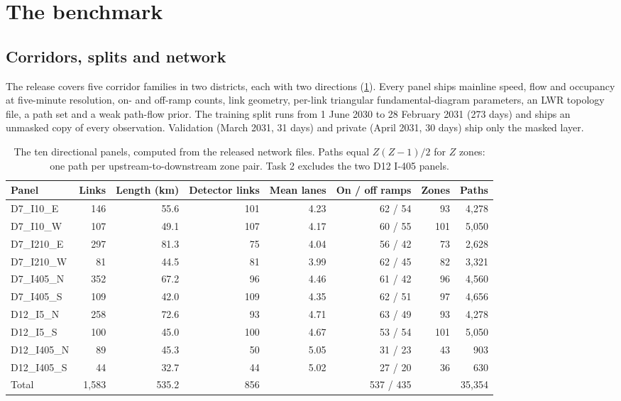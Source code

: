 \section{The benchmark}\label{sec:benchmark}

\subsection{Corridors, splits and network}
The release covers five corridor families in two districts, each with two directions (\cref{tab:corridors}).
Every panel ships mainline speed, flow and occupancy at five-minute resolution, on- and off-ramp counts, link
geometry, per-link triangular fundamental-diagram parameters, an LWR topology file, a path set and a weak path-flow
prior. The training split runs from 1 June 2030 to 28 February 2031 (273 days) and ships an unmasked copy of every
observation. Validation (March 2031, 31 days) and private (April 2031, 30 days) ship only the masked layer.

\begin{table}[h]
\centering\small
\caption{The ten directional panels, computed from the released network files. Paths equal $Z(Z-1)/2$ for $Z$
zones: one path per upstream-to-downstream zone pair. Task 2 excludes the two D12 I-405 panels.}\label{tab:corridors}
\begin{tabular}{@{}l r r r r r r r@{}}
\toprule
Panel & Links & Length (km) & Detector links & Mean lanes & On / off ramps & Zones & Paths \\
\midrule
D7\_I10\_E    & 146 & 55.6 & 101 & 4.23 & 62 / 54 & 93 & 4,278 \\
D7\_I10\_W    & 107 & 49.1 & 107 & 4.17 & 60 / 55 & 101 & 5,050 \\
D7\_I210\_E   & 297 & 81.3 & 75  & 4.04 & 56 / 42 & 73 & 2,628 \\
D7\_I210\_W   & 81  & 44.5 & 81  & 3.99 & 62 / 45 & 82 & 3,321 \\
D7\_I405\_N   & 352 & 67.2 & 96  & 4.46 & 61 / 42 & 96 & 4,560 \\
D7\_I405\_S   & 109 & 42.0 & 109 & 4.35 & 62 / 51 & 97 & 4,656 \\
D12\_I5\_N    & 258 & 72.6 & 93  & 4.71 & 63 / 49 & 93 & 4,278 \\
D12\_I5\_S    & 100 & 45.0 & 100 & 4.67 & 53 / 54 & 101 & 5,050 \\
D12\_I405\_N  & 89  & 45.3 & 50  & 5.05 & 31 / 23 & 43 & 903 \\
D12\_I405\_S  & 44  & 32.7 & 44  & 5.02 & 27 / 20 & 36 & 630 \\
\midrule
Total         & 1,583 & 535.2 & 856 & & 537 / 435 & & 35,354 \\
\bottomrule
\end{tabular}
\end{table}

